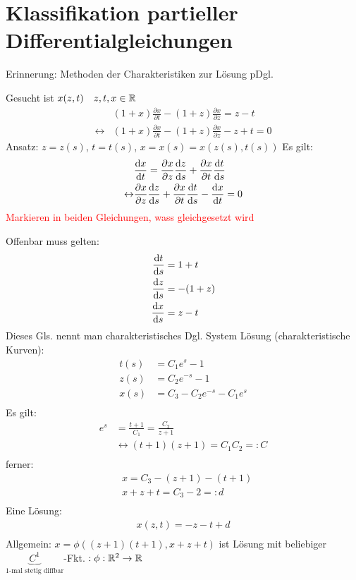 \newpage
\section{Klassifikation partieller Differentialgleichungen}
\setcounter{equation}{0}
Erinnerung: Methoden der Charakteristiken zur Lösung pDgl.
\begin{bsp} 
Gesucht ist $x(z,t) \quad z,t,x \in \mathbb{R}$
\begin{align*} 
&(1+x)\frac{\partial x}{\partial t}-(1+z)\frac{\partial x}{\partial z} = z - t \\
\leftrightarrow&(1+x)\frac{\partial x}{\partial t}-(1+z)\frac{\partial x}{\partial z}  -z + t = 0
\end{align*}
Ansatz: $z=z(s)$, $t=t(s)$, $x=x(s)=x(z(s),t(s))$
Es gilt:
\begin{align*} 
&\frac{\mathrm{d} x}{\mathrm{d} t} = \frac{\partial x}{\partial z}\frac{\mathrm{d} z}{\mathrm{d} s} +\frac{\partial x}{\partial t}\frac{\mathrm{d} t}{\mathrm{d} s}  \\
\leftrightarrow & \frac{\partial x}{\partial z}\frac{\mathrm{d} z}{\mathrm{d} s} +\frac{\partial x}{\partial t}\frac{\mathrm{d} t}{\mathrm{d} s} - \frac{\mathrm{d} x}{\mathrm{d} t} = 0
\end{align*}
\textcolor{red}{Markieren in beiden Gleichungen, wass gleichgesetzt wird}

Offenbar muss gelten:
\begin{align*}
\frac{\mathrm{d} t}{\mathrm{d} s} &= 1+t \\
\frac{\mathrm{d} z}{\mathrm{d} s} &= -(1+z) \\
\frac{\mathrm{d} x}{\mathrm{d} s} &= z-t
\end{align*}
Dieses Gls. nennt man charakteristisches Dgl. System
Lösung (charakteristische Kurven):
\begin{align*}
t(s) &= C_1 e^s -1 \\
z(s) &= C_2 e^{-s} - 1 \\
x(s) &= C_3-C_2 e^{-s} - C_1 e^s \\
\end{align*}
Es gilt: 
\begin{align*}
e^s &= \frac{t+1}{C_1} = \frac{C_2}{z+1} \\
&\leftrightarrow (t+1)(z+1) = C_1C_2=:C \\
\end{align*}
ferner:
\begin{align*}
&x = C_3 - (z+1)-(t+1) \\
&x+z+t = C_3-2=: d \\
\end{align*}
Eine Lösung:
\begin{align*}
x(z,t)=-z-t+d \\
\end{align*}
Allgemein: $x = \phi((z+1)(t+1),x+z+t)$ ist Lösung mit beliebiger $\underbrace{C^1}_{\text{1-mal stetig diffbar}}$-Fkt. $: \phi:\mathbb{R}^2 \rightarrow \mathbb{R}$
\end{bsp}
